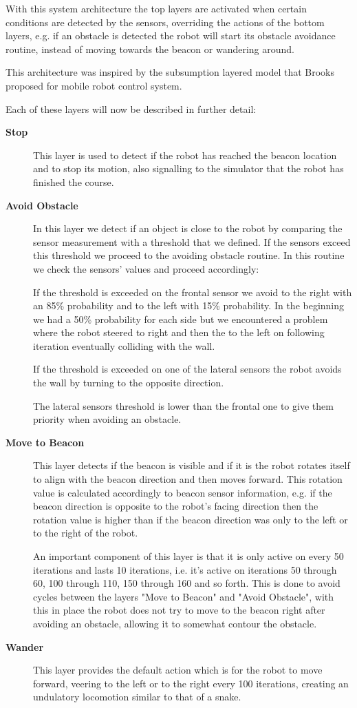 \documentclass[oribibl]{llncs}
\begin{document}
With this system architecture the top layers are activated when certain conditions are detected by the sensors, overriding the actions of the bottom layers, e.g. if an obstacle is detected the robot will start its obstacle avoidance routine, instead of moving towards the beacon or wandering around. 

This architecture was inspired by the subsumption layered model that Brooks proposed for mobile robot control system.\cite{Brooks_1986}

Each of these layers will now be described in further detail:
\begin{description}
  \item[\textbf{Stop}]
  This layer is used to detect if the robot has reached the beacon location and to stop its motion, also signalling to the simulator that the robot has finished the course.
  \item[\textbf{Avoid Obstacle}]
  In this layer we detect if an object is close to the robot by comparing the sensor measurement with a threshold that we defined. If the sensors exceed this threshold we proceed to the avoiding obstacle routine. In this routine we check the sensors' values and proceed accordingly: 
  
  If the threshold is exceeded on the frontal sensor we avoid to the right with an 85\% probability and to the left with 15\% probability. In the beginning we had a 50\% probability for each side but we encountered a problem where the robot steered to right and then the to the left on following iteration eventually colliding with the wall.
  
  If the threshold is exceeded on one of the lateral sensors the robot avoids the wall by turning to the opposite direction.
  
  The lateral sensors threshold is lower than the frontal one to give them priority when avoiding an obstacle.
  \item[\textbf{Move to Beacon}]
  This layer detects if the beacon is visible and if it is the robot rotates itself to align with the beacon direction and then moves forward. This rotation value is calculated accordingly to beacon sensor information, e.g. if the beacon direction is opposite to the robot's facing direction then the rotation value is higher than if the beacon direction was only to the left or to the right of the robot.
  
  An important component of this layer is that it is only active on every 50 iterations and lasts 10 iterations, i.e. it's active on iterations 50 through 60, 100 through 110, 150 through 160 and so forth. This is done to avoid cycles between the layers "Move to Beacon" and "Avoid Obstacle", with this in place the robot does not try to move to the beacon right after avoiding an obstacle, allowing it to somewhat contour the obstacle.
  \item[\textbf{Wander}]
  This layer provides the default action which is for the robot to move forward, veering to the left or to the right every 100 iterations, creating an undulatory locomotion similar to that of a snake.
\end{description}
\end{document}
